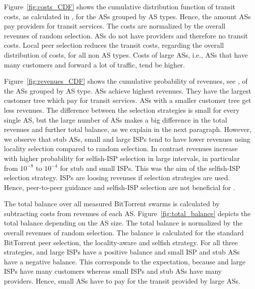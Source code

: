 Figure~\ref{fig:costs_CDF} shows the cumulative distribution function of transit costs, as calculated in , for the ASs grouped by AS types. Hence, the amount ASs pay providers for transit services. The costs are normalized by the overall revenues of random selection. \tier ASs do not have providers and therefore no transit costs. Local peer selection reduces the transit costs, regarding the overall distribution of costs, for all non \tier AS types. Costs of large ASs, i.e., ASs that have many customers and forward a lot of traffic, tend be higher.



Figure~\ref{fig:revenues_CDF} shows the cumulative probability of revenues, see , of the ASs grouped by AS type. \Tier ASs achieve highest revenues. They have the largest customer tree which pay for transit services. ASs with a smaller customer tree get less revenues. The difference between the selection strategies is small for every single AS, but the large number of ASs makes a big difference in the total revenues and further total balance, as we explain in the next paragraph. However, we observe that stub ASs, small and large ISPs tend to have lower revenues using locality selection compared to random selection. In contrast revenues increase with higher probability for selfish-ISP selection in large intervals, in particular from $10^{-8}$ to $10^{-4}$ for stub and small ISPs. This was the aim of the selfish-ISP selection strategy. \Tier ISPs are loosing revenues if selection strategies are used. Hence, peer-to-peer guidance and selfish-ISP selection are not beneficial for \tier.

The total balance over all measured BitTorrent swarms is calculated by subtracting costs from revenues of each AS. Figure~\ref{fig:total_balance} depicts the total balance depending on the AS size. The total balance is normalized by the overall revenues of random selection. The balance is calculated for the standard BitTorrent peer selection, the locality-aware and selfish strategy.
For all three strategies, \tier and large ISPs have a positive balance and small ISP and stub ASs have a negative balance. This corresponds to the expectation, because \tier and large ISPs have many customers whereas small ISPs and stub ASs have many providers. Hence, small ASs have to pay for the transit provided by large ASs.

